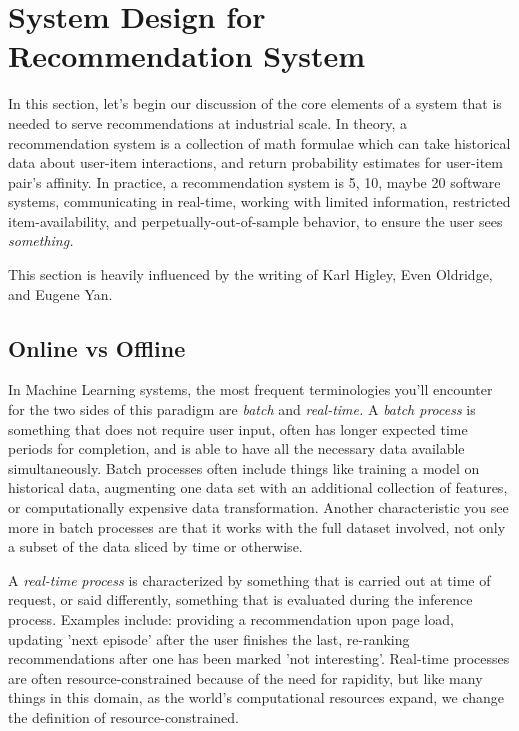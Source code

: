 \chapter{System Design for Recommendation System}
\label{ch:system_design}

In this section, let's begin our discussion of the core elements of a system that is needed to serve recommendations at industrial scale. In theory, a recommendation system is a collection of math formulae which can take historical data about user-item interactions, and return probability estimates for user-item pair's affinity. In practice, a recommendation system is 5, 10, maybe 20 software systems, communicating in real-time, working with limited information, restricted item-availability, and perpetually-out-of-sample behavior, to ensure the user sees \emph{something.}

This section is heavily influenced by the writing of Karl Higley, Even Oldridge, and Eugene Yan.

\section{Online vs Offline}

In Machine Learning systems, the most frequent terminologies you'll encounter for the two sides of this paradigm are \emph{batch} and \emph{real-time.}
A \emph{batch process} is something that does not require user input, often has longer expected time periods for completion, and is able to have all the necessary data available simultaneously. Batch processes often include things like training a model on historical data, augmenting one data set with an additional collection of features, or computationally expensive data transformation. Another characteristic you see more in batch processes are that it works with the full dataset involved, not only a subset of the data sliced by time or otherwise.

A \emph{real-time} \emph{process} is characterized by something that is carried out at time of request, or said differently, something that is evaluated during the inference process. Examples include: providing a recommendation upon page load, updating 'next episode' after the user finishes the last, re-ranking recommendations after one has been marked 'not interesting'. Real-time processes are often resource-constrained because of the need for rapidity, but like many things in this domain, as the world's computational resources expand, we change the definition of resource-constrained.

